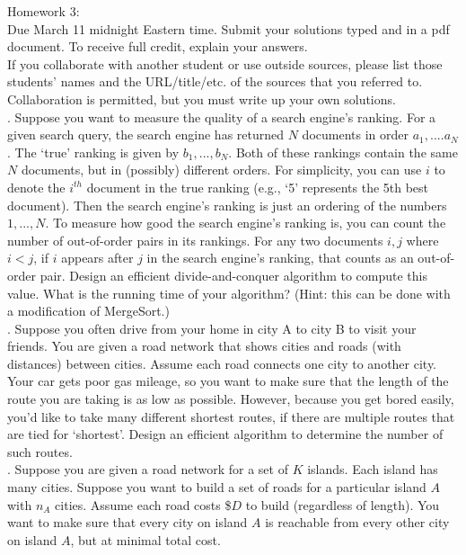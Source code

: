 \documentclass[12pt]{article}
\begin{document}
\noindent
\large Homework 3:\\
 \normalsize 
 \noindent
Due March 11 midnight Eastern time.  Submit your solutions typed and in a pdf document.  To receive full credit, explain your answers.\\

\noindent
If you collaborate with another student or use outside sources, please list those students' names and the URL/title/etc. of the sources that you referred to.  Collaboration is permitted, but you must write up your own solutions.\\


. Suppose you want to measure the quality of a search engine's ranking.  For a given search query, the search engine has returned $N$ documents in order $a_1, .... a_N$.  The `true' ranking is given by $b_1, ..., b_N$.  Both of these rankings contain the same $N$ documents, but in (possibly) different orders.  For simplicity, you can use $i$ to denote the $i^{th}$ document in the true ranking (e.g., `5' represents the 5th best document).  Then the search engine's ranking is just an ordering of the numbers $1, ..., N$.  To measure how good the search engine's ranking is, you can count the number of out-of-order pairs in its rankings.  For any two documents $i, j$ where $i < j$, if $i$ appears after $j$ in the search engine's ranking, that counts as an out-of-order pair.  Design an efficient divide-and-conquer algorithm to compute this value.  What is the running time of your algorithm?  (Hint: this can be done with a modification of MergeSort.)  \\

.  Suppose you often drive from your home in city A to city B to visit your friends.  You are given a road network that shows cities and roads (with distances) between cities.  Assume each road connects one city to another city.  Your car gets poor gas mileage, so you want to make sure that the length of the route you are taking is as low as possible.  However, because you get bored easily, you'd like to take many different shortest routes, if there are multiple routes that are tied for `shortest'.  Design an efficient algorithm to determine the number of such routes.\\

.  Suppose you are given a road network for a set of $K$ islands.  Each island has many cities.  Suppose you want to build a set of roads for a particular island $A$ with $n_A$ cities.  Assume each road costs \$$D$ to build (regardless of length).  You want to make sure that every city on island $A$ is reachable from every other city on island $A$, but at minimal total cost.\\
\end{document}
